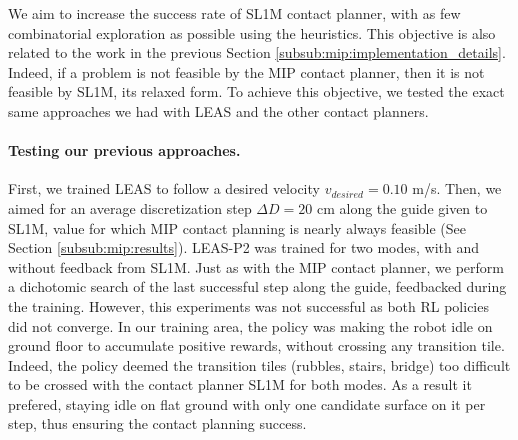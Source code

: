 We aim to increase the success rate of SL1M contact planner, with as few combinatorial exploration as possible using the heuristics.
This objective is also related to the work in the previous Section \ref{subsub:mip:implementation_details}. 
Indeed, if a problem is not feasible by the MIP contact planner, then it is not feasible by SL1M, its relaxed form.
To achieve this objective, we tested the exact same approaches we had with LEAS and the other contact planners.

\paragraph{Testing our previous approaches.}
First, we trained LEAS to follow a desired velocity $v_{desired}=0.10$ m/s. 
Then, we aimed for an average discretization step $\Delta D=20$ cm along the guide given to SL1M, value for which MIP contact planning is nearly always feasible (See Section \ref{subsub:mip:results}).
LEAS-P2 was trained for two modes, with and without feedback from SL1M. Just as with the MIP contact planner, we perform a dichotomic search of the last successful step along the guide, feedbacked during the training.
However, this experiments was not successful as both RL policies did not converge.
In our training area, the policy was making the robot idle on ground floor to accumulate positive rewards, without crossing any transition tile. 
Indeed, the policy deemed the transition tiles (rubbles, stairs, bridge) too difficult to be crossed with the contact planner SL1M for both modes.
As a result it prefered, staying idle on flat ground with only one candidate surface on it per step, thus ensuring the contact planning success.

